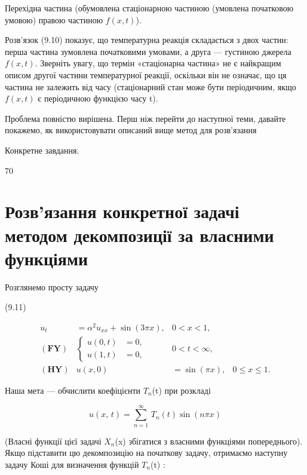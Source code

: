 \documentclass[
  ukrainian,
]{article}
\begin{document}
Перехідна частина (обумовлена стаціонарною частиною (умовлена початковою
умовою) правою частиною \(f(x, t)\)).

Розв'язок (9.10) показує, що температурна реакція складається з двох
частин: перша частина зумовлена початковими умовами, а друга ---
густиною джерела \(f(x,t)\). Зверніть увагу, що термін «стаціонарна
частина» не є найкращим описом другої частини температурної реакції,
оскільки він не означає, що ця частина не залежить від часу
(стаціонарний стан може бути періодичним, якщо \(f(x, t)\) є періодичною
функцією часу t).

Проблема повністю вирішена. Перш ніж перейти до наступної теми, давайте
покажемо, як використовувати описаний вище метод для розв'язання

Конкретне завдання.

70

\section{Розв'язання конкретної задачі методом декомпозиції за власними
функціями}\label{ux440ux43eux437ux432ux44fux437ux430ux43dux43dux44f-ux43aux43eux43dux43aux440ux435ux442ux43dux43eux457-ux437ux430ux434ux430ux447ux456-ux43cux435ux442ux43eux434ux43eux43c-ux434ux435ux43aux43eux43cux43fux43eux437ux438ux446ux456ux457-ux437ux430-ux432ux43bux430ux441ux43dux438ux43cux438-ux444ux443ux43dux43aux446ux456ux44fux43cux438}

Розглянемо просту задачу

(9.11)

\[
\begin{aligned} u_t &= \alpha^2 u_{xx} + \sin{(3\pi x)}, & 0 < x < 1, \\ (\mathbf{FY}) & \begin{cases} u(0, t) &= 0, \\ u(1, t) &= 0, \end{cases} & 0 < t < \infty, \\ (\mathbf{HY}) & u(x, 0) &= \sin{(\pi x)}, & 0 \leq x \leq 1. \end{aligned}
\]

Наша мета --- обчислити коефіцієнти \(T_n\)(t) при розкладі

\[
u\left(x,\,t\right)=\sum_{n=1}^{\infty}\,T_{n}\left(t\right)\sin\left(n\pi x\right)
\]

(Власні функції цієї задачі \(X_n\)(x) збігатися з власними функціями
попереднього). Якщо підставити цю декомпозицію на початкову задачу,
отримаємо наступну задачу Коші для визначення функцій \(T_n\)(t) :
\end{document}

